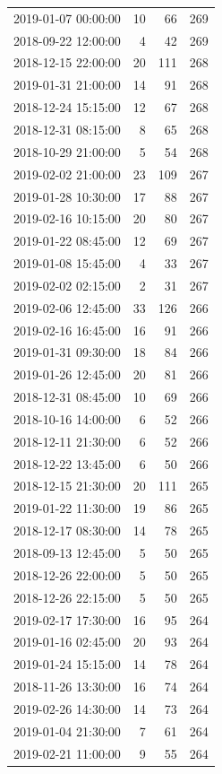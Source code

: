 \begin{tabular}{lrrr}
2019-01-07 00:00:00 & 10 & 66 & 269 \\
2018-09-22 12:00:00 & 4 & 42 & 269 \\
2018-12-15 22:00:00 & 20 & 111 & 268 \\
2019-01-31 21:00:00 & 14 & 91 & 268 \\
2018-12-24 15:15:00 & 12 & 67 & 268 \\
2018-12-31 08:15:00 & 8 & 65 & 268 \\
2018-10-29 21:00:00 & 5 & 54 & 268 \\
2019-02-02 21:00:00 & 23 & 109 & 267 \\
2019-01-28 10:30:00 & 17 & 88 & 267 \\
2019-02-16 10:15:00 & 20 & 80 & 267 \\
2019-01-22 08:45:00 & 12 & 69 & 267 \\
2019-01-08 15:45:00 & 4 & 33 & 267 \\
2019-02-02 02:15:00 & 2 & 31 & 267 \\
2019-02-06 12:45:00 & 33 & 126 & 266 \\
2019-02-16 16:45:00 & 16 & 91 & 266 \\
2019-01-31 09:30:00 & 18 & 84 & 266 \\
2019-01-26 12:45:00 & 20 & 81 & 266 \\
2018-12-31 08:45:00 & 10 & 69 & 266 \\
2018-10-16 14:00:00 & 6 & 52 & 266 \\
2018-12-11 21:30:00 & 6 & 52 & 266 \\
2018-12-22 13:45:00 & 6 & 50 & 266 \\
2018-12-15 21:30:00 & 20 & 111 & 265 \\
2019-01-22 11:30:00 & 19 & 86 & 265 \\
2018-12-17 08:30:00 & 14 & 78 & 265 \\
2018-09-13 12:45:00 & 5 & 50 & 265 \\
2018-12-26 22:00:00 & 5 & 50 & 265 \\
2018-12-26 22:15:00 & 5 & 50 & 265 \\
2019-02-17 17:30:00 & 16 & 95 & 264 \\
2019-01-16 02:45:00 & 20 & 93 & 264 \\
2019-01-24 15:15:00 & 14 & 78 & 264 \\
2018-11-26 13:30:00 & 16 & 74 & 264 \\
2019-02-26 14:30:00 & 14 & 73 & 264 \\
2019-01-04 21:30:00 & 7 & 61 & 264 \\
2019-02-21 11:00:00 & 9 & 55 & 264 \\

\end{tabular}
